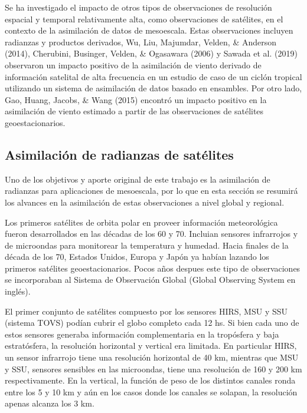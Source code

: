 \documentclass[12pt,twoside]{reedthesis}
\begin{document}
Se ha investigado el impacto de otros tipos de observaciones de resolución espacial y temporal relativamente alta, como observaciones de satélites, en el contexto de la asimilación de datos de mesoescala. Estas observaciones incluyen radianzas y productos derivados, Wu, Liu, Majumdar, Velden, \& Anderson (2014), Cherubini, Businger, Velden, \& Ogasawara (2006) y Sawada et al. (2019) observaron un impacto positivo de la asimilación de viento derivado de información satelital de alta frecuencia en un estudio de caso de un ciclón tropical utilizando un sistema de asimilación de datos basado en ensambles. Por otro lado, Gao, Huang, Jacobs, \& Wang (2015) encontró un impacto positivo en la asimilación de viento estimado a partir de las observaciones de satélites geoestacionarios.

\hypertarget{asimilaciuxf3n-de-radianzas-de-satuxe9lites}{%
\subsection{Asimilación de radianzas de satélites}\label{asimilaciuxf3n-de-radianzas-de-satuxe9lites}}

Uno de los objetivos y aporte original de este trabajo es la asimilación de radianzas para aplicaciones de mesoescala, por lo que en esta sección se resumirá los alvances en la asimilación de estas observaciones a nivel global y regional.

Los primeros satélites de orbita polar en proveer información meteorológica fueron desarrollados en las décadas de los 60 y 70. Incluian sensores infrarrojos y de microondas para monitorear la temperatura y humedad. Hacia finales de la década de los 70, Estados Unidos, Europa y Japón ya habían lazando los primeros satélites geoestacionarios. Pocos años despues este tipo de observaciones se incorporaban al Sistema de Observación Global (Global Observing System en inglés).

El primer conjunto de satélites compuesto por los sensores HIRS, MSU y SSU (sistema TOVS) podían cubrir el globo completo cada 12 hs. Si bien cada uno de estos sensores generaba información complementaria en la tropósfera y baja estratósfera, la resolución horizontal y vertical era limitada. En particular HIRS, un sensor infrarrojo tiene una resolución horizontal de 40 km, mientras que MSU y SSU, sensores sensibles en las microondas, tiene una resolución de 160 y 200 km respectivamente. En la vertical, la función de peso de los distintos canales ronda entre los 5 y 10 km y aún en los casos donde los canales se solapan, la resolución apenas alcanza los 3 km.
\end{document}
